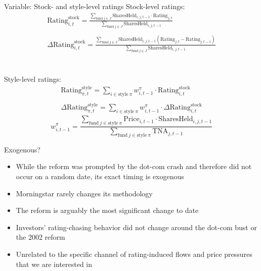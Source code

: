 \documentclass[UTF8, 16pt]{beamer}
\begin{document}
\begin{CJK*}{UTF8}{gbsn}
\begin{frame}{Variable: Stock- and style-level ratings}
	\alert{Stock}-level ratings:
	$$
	\begin{array}{c}
		\mathrm { Rating }_{i, t}^{\text{stock}}  =\frac{\sum_{\text {fund}\ j \in J} \mathrm{SharesHeld}_{i, j, t-1} \cdot \mathrm{Rating }_{j, t}}{\sum_{\text{fund}\ j\in J} \mathrm{SharesHeld}_{i, j, t-1}}
		\\ \ \\
	 	\Delta\mathrm{Rating}_{i, t}^{\text{stock}} =\frac{\sum_{\mathrm{fund}\ j \in J}\mathrm{SharesHeld}_{i, j, t-1}(\mathrm{Rating}_{j, t}-\text {Rating}_{j, t-1})}{\sum_{\text{fund}\ j\in J} \mathrm{SharesHeld}_{i, j, t-1}}
	 	\end{array}
	$$
	\\ \ \\
	\alert{Style}-level ratings:
	$$
	\begin{array}{c}
	\mathrm{ Rating }_{\pi, t}^{\text{style}}=\sum_{i \in \text{style}\ \pi} w_{i, t-1}^{\pi} \cdot \mathrm{Rating}_{i, t}^{\text{stock}}
	\\ \ \\
	\Delta\mathrm{Rating}_{\pi, t}^{\text{style}}=\sum_{i \in \text{style}\ \pi} w_{i, t-1}^{\pi} \cdot \Delta \mathrm{Rating}_{i, t}^{\text{stock}}
	\end{array}
	$$
	$$
	w_{i, t-1}^{\pi}=\frac{\sum_{\text{fund}\ j \in \text {style}\ \pi } \mathrm{Price}_{i, t-1} \cdot \mathrm{SharesHeld}_{i, j, t-1}}{\sum_{\text{fund}\ j \in \text{style}\ \pi} \mathrm{TNA}_{j, t-1}}
	$$
\end{frame}

\begin{frame}{Exogenous?}
	\begin{itemize}
		\item While the reform was prompted by the dot-com crash and therefore did \alert{not} occur on a random date, its \alert{exact timing} is exogenous
		\item Morningstar \alert{rarely changes} its methodology
		\item The reform is arguably \alert{the most significant change to date}
		\item Investors’ \alert{rating-chasing behavior did not change} around the dot-com bust or the 2002 reform
		\item \alert{Unrelated} to the specific channel of rating-induced flows and price pressures that we are interested in
	\end{itemize}
\end{frame}



\end{CJK*}
\end{document}

